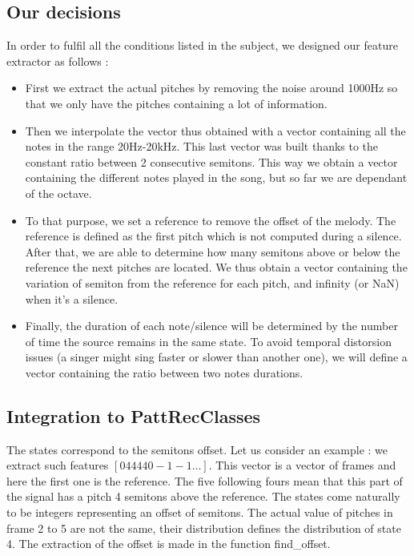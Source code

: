 \documentclass[a4paper]{report}
\begin{document}
\subsection{Our decisions}
In order to fulfil all the conditions listed in the subject, we designed our feature extractor as follows :
\begin{itemize}
\item First we extract the actual pitches by removing the noise around 1000Hz so that we only have the pitches containing a lot of information.

\item Then we interpolate the vector thus obtained with a vector containing all the notes in the range 20Hz-20kHz. This last vector was built thanks to the constant ratio between 2 consecutive semitons. This way we obtain a vector containing the different notes played in the song, but so far we are dependant of the octave.

\item To that purpose, we set a reference to remove the offset of the melody. The reference is defined as the first pitch which is not computed during a silence. After that, we are able to determine how many semitons above or below the reference the next pitches are located. We thus obtain a vector containing the variation of semiton from the reference for each pitch, and infinity (or NaN) when it's a silence.

\item Finally, the duration of each note/silence will be determined by the number of time the source remains in the same state. To avoid temporal distorsion issues (a singer might sing faster or slower than another one), we will define a vector containing the ratio between two notes durations.
\end{itemize}

\subsection{Integration to PattRecClasses}
The states correspond to the semitons offset. Let us consider an example : we extract such features $[0 4 4 4 4 0 -1 -1 \dots]$. This vector is a vector of frames and here the first one is the reference. The five following fours mean that this part of the signal has a pitch 4 semitons above the reference. The states come naturally to be integers representing an offset of semitons. The actual value of pitches in frame 2 to 5 are not the same, their distribution defines the distribution of state 4.
The extraction of the offset is made in the function find\_offset.
\end{document}
